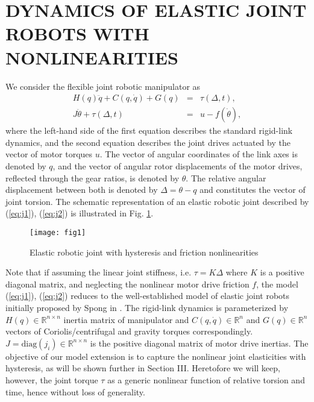 \documentclass[a4paper, 10pt, conference]{ieeeconf}
\begin{document}
\section{DYNAMICS OF ELASTIC JOINT ROBOTS WITH NONLINEARITIES}
\label{sec:2}


We consider the flexible joint robotic manipulator as
\begin{eqnarray}\label{eq:j1}
H(q)\ddot{q} +C(q, \dot{q}) +G(q)  &=& \tau(\Delta,t), \\
  J\ddot{\theta} + \tau(\Delta,t) &=& u - f(\dot{\theta}),
\label{eq:j2}
\end{eqnarray}
where the left-hand side of the first equation describes the
standard rigid-link dynamics, and the second equation describes
the joint drives actuated by the vector of motor torques $u$. The
vector of angular coordinates of the link axes is denoted by $q$,
and the vector of angular rotor displacements of the motor drives,
reflected through the gear ratios, is denoted by $\theta$. The
relative angular displacement between both is denoted by $\Delta =
\theta - q$ and constitutes the vector of joint torsion. The
schematic representation of an elastic robotic joint described by
(\ref{eq:j1}), (\ref{eq:j2}) is illustrated in Fig.
\ref{fig:joint}.
\begin{figure}[!h]
\centering
\texttt{[image: fig1]}
\caption{Elastic robotic joint with hysteresis and friction
nonlinearities} \label{fig:joint}
\end{figure}
Note that if assuming the linear joint stiffness, i.e. $\tau = K
\Delta$ where $K$ is a positive diagonal matrix, and neglecting
the nonlinear motor drive friction $f$, the model (\ref{eq:j1}),
(\ref{eq:j2}) reduces to the well-established model of elastic
joint robots initially proposed by Spong in \cite{spong87}. The
rigid-link dynamics is parameterized by $H(q) \in \mathbb{R}^{n
\times n}$ inertia matrix of manipulator and $C(q,\dot{q}) \in
\mathbb{R}^{n}$ and $G(q) \in \mathbb{R}^{n}$ vectors of
Coriolis/centrifugal and gravity torques correspondingly. $J =
\mathrm{diag} (j_{i}) \in \mathbb{R}^{n \times n}$ is the positive
diagonal matrix of motor drive inertias. The objective of our
model extension is to capture the nonlinear joint elasticities
with hysteresis, as will be shown further in Section III.
Heretofore we will keep, however, the joint torque $\tau$ as a
generic nonlinear function of relative torsion and time, hence
without loss of generality.
\end{document}
